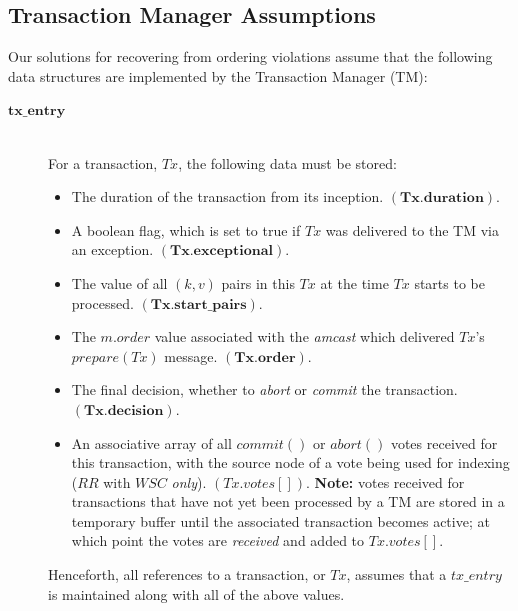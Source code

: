     \subsection{Transaction Manager Assumptions}
    Our solutions for recovering from ordering violations assume that the following data structures are implemented by the Transaction Manager (TM):
    
    \begin{description}
        \item[$\bm{tx\_entry}$] \hfill \\
        For a transaction, $Tx$, the following data must be stored:
            \begin{itemize}
                \item    The duration of the transaction from its inception. $(\bm{Tx.duration})$.            
            
                \item    A boolean flag, which is set to true if $Tx$ was delivered to the TM via an exception.  $(\bm{Tx.exceptional})$.
            
                \item    The value of all $(k,v)$ pairs in this $Tx$ at the time $Tx$ starts to be processed. $(\bm{Tx.start\_pairs})$.
                
                \item    The $m.order$ value associated with the \emph{amcast} which delivered $Tx$'s $prepare(Tx)$ message.  $(\bm{Tx.order})$.
                
                \item    The final decision, whether to \emph{abort} or \emph{commit} the transaction. $(\bm{Tx.decision})$.
                
                \item    An associative array of all $commit()$ or $abort()$ votes received for this transaction, with the source node of a vote being used for indexing ($RR$ with $WSC$ \emph{only}).  $(Tx.votes[])$. \textbf{Note:} votes received for transactions that have not yet been processed by a TM are stored in a temporary buffer until the associated transaction becomes active; at which point the votes are \emph{received} and added to $Tx.votes[]$.  
            \end{itemize}
            
        Henceforth, all references to a transaction, or $Tx$, assumes that a $tx\_entry$ is maintained along with all of the above values.  
            

\end{description}
